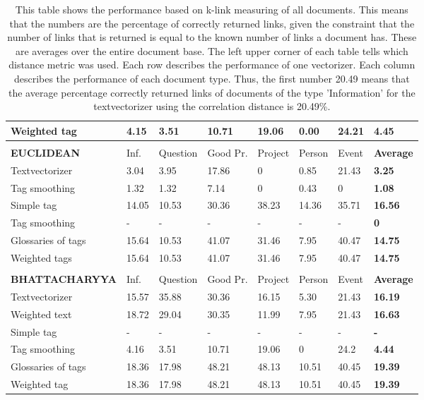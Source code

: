 \begin{table}
\begin{tabular}{| l | l | l | l | l | l | l | l |}
Weighted tag & 4.15 & 3.51 & 10.71 & 19.06 & 0.00 & 24.21 & {\bf 4.45} \\ 
\hline
\\
\hline
{\bf EUCLIDEAN} & Inf. &  Question &  Good Pr.& Project & Person &  Event & {\bf Average} \\
\hline
Textvectorizer & 3.04 & 3.95 & 17.86 & 0 & 0.85 & 21.43 & {\bf 3.25} \\ 
Tag smoothing & 1.32 & 1.32 & 7.14 & 0 & 0.43 & 0 & {\bf 1.08} \\ 
Simple tag & 14.05 & 10.53  & 30.36 & 38.23 & 14.36 & 35.71 & {\bf 16.56} \\ 
Tag smoothing & - & - & - & - & - & - & {\bf 0} \\ 
Glossaries of tags & 15.64 & 10.53 & 41.07 & 31.46 & 7.95 & 40.47 & {\bf 14.75} \\ 
Weighted tags & 15.64 & 10.53 & 41.07 & 31.46 & 7.95 & 40.47 & {\bf 14.75} \\ 
\hline
\\
\hline
{\bf BHATTACHARYYA} & Inf. &  Question &  Good Pr.& Project & Person &  Event & {\bf Average} \\
\hline
Textvectorizer & 15.57 & 35.88 & 30.36 & 16.15 & 5.30 & 21.43 & {\bf 16.19} \\ 
Weighted text & 18.72 & 29.04 & 30.35 & 11.99 & 7.95 & 21.43 & {\bf 16.63} \\ 
Simple tag & - & - & - & - & - & - & {\bf -} \\ 
Tag smoothing & 4.16 & 3.51 & 10.71 & 19.06 & 0 & 24.2 & {\bf 4.44} \\ 
Glossaries of tags & 18.36 & 17.98 & 48.21 & 48.13 & 10.51 & 40.45 & {\bf 19.39} \\ 
Weighted tag & 18.36 & 17.98 & 48.21 & 48.13 & 10.51 & 40.45 & {\bf 19.39} \\ 
\hline
\end{tabular}

\caption{This table shows the performance based on k-link measuring of all documents. This means that the numbers are the percentage of correctly returned links, given the constraint that the number of links that is returned is equal to the known number of links a document has. These are averages over the entire document base. The left upper corner of each table tells which distance metric was used. Each row describes the performance of one vectorizer. Each column describes the performance of each document type. Thus, the first number 20.49 means that the average percentage correctly returned links of documents of the type 'Information' for the textvectorizer using the correlation distance is 20.49\%.}
\label{klink}
\end{table}

